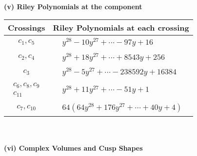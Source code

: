 \documentclass[1p]{elsarticle_modified}
\theoremstyle{definition}
\begin{document}
\newpage\renewcommand{\arraystretch}{1}
\flushleft \textbf{(v) Riley Polynomials at the component}\newline \\
\begin{tabular}{m{50pt}|m{274pt}}
Crossings & \hspace{64pt}Riley Polynomials at each crossing \\
\hline $$\begin{aligned}c_{1},c_{5}\end{aligned}$$&$\begin{aligned}
&y^{28}-10 y^{27}+\cdots-97 y+16
\end{aligned}$\\
\hline $$\begin{aligned}c_{2},c_{4}\end{aligned}$$&$\begin{aligned}
&y^{28}+18 y^{27}+\cdots+8543 y+256
\end{aligned}$\\
\hline $$\begin{aligned}c_{3}\end{aligned}$$&$\begin{aligned}
&y^{28}-5 y^{27}+\cdots-238592 y+16384
\end{aligned}$\\
\hline $$\begin{aligned}c_{6},c_{8},c_{9}\\c_{11}\end{aligned}$$&$\begin{aligned}
&y^{28}+11 y^{27}+\cdots-51 y+1
\end{aligned}$\\
\hline $$\begin{aligned}c_{7},c_{10}\end{aligned}$$&$\begin{aligned}
&64(64 y^{28}+176 y^{27}+\cdots+40 y+4)
\end{aligned}$\\
\hline
\end{tabular}\\~\\
\newpage\flushleft \textbf{(vi) Complex Volumes and Cusp Shapes}
\end{document}

